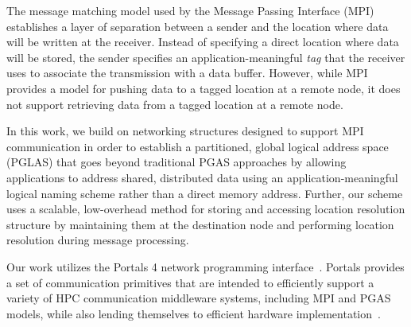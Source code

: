 The message matching model used by the Message Passing Interface (MPI)~\cite{mpi-forum:15}
establishes a layer of separation between a sender and the location where data
will be written at the receiver.  Instead of specifying a direct location where
data will be stored, the sender specifies an application-meaningful {\em tag}
that the receiver uses to associate the transmission with a data buffer.
However, while MPI provides a model for pushing data to a tagged location at a
remote node, it does not support retrieving data from a tagged location at a
remote node.


In this work, we build on networking structures designed to support MPI
communication in order to establish a partitioned, global logical address space
(PGLAS) that goes beyond traditional PGAS approaches by allowing applications
to address shared, distributed data using an application-meaningful logical
naming scheme rather than a direct memory address.
Further, our scheme uses a scalable, low-overhead method for storing and
accessing location resolution structure by maintaining them at the destination
node and performing location resolution during message processing.

Our work utilizes the
Portals 4 network programming interface~\cite{portals4}.  Portals provides a set
of communication primitives that are intended to efficiently support a variety
of HPC communication middleware systems, including MPI and PGAS models, while
also lending themselves to efficient hardware
implementation~\cite{brightwell:micro:06,bxi}.


